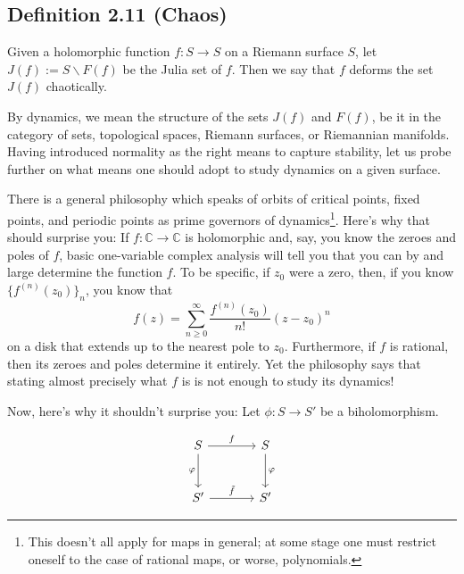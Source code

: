 \documentclass[11pt,a4paper]{article}
\begin{document}

        \subsection*{Definition 2.11 (Chaos)} Given a holomorphic function $f: S\rightarrow S$ on a Riemann surface $S$, let $J(f) := S\backslash F(f)$ be the Julia set of $f$. Then we say that $f$ deforms the set $J(f)$ chaotically.



        By dynamics, we mean the structure of the sets $J(f)$ and $F(f)$, be it in the category of sets, topological spaces, Riemann surfaces, or Riemannian manifolds. Having introduced normality as the right means to capture stability, let us probe further on what means one should adopt to study dynamics on a given surface.

        There is a general philosophy which speaks of orbits of critical points, fixed points, and periodic points as prime governors of dynamics\footnote{This doesn't all apply for maps in general; at some stage one must restrict oneself to the case of rational maps, or worse, polynomials.}. Here's why that should surprise you: If $f: \mathbb{C} \rightarrow \mathbb{C}$ is holomorphic and, say, you know the zeroes and poles of $f$, basic one-variable complex analysis will tell you that you can by and large determine the function $f$. To be specific, if $z_0$ were a zero, then, if you know $\{f^{(n)}(z_0)\}_n$, you know that
        $$f(z) = \sum_{n \geq 0}^{\infty}{\frac{f^{(n)}(z_0)}{n!}(z-z_0)^n}$$
        on a disk that extends up to the nearest pole to $z_0$. Furthermore, if $f$ is rational, then its zeroes and poles determine it entirely. Yet the philosophy says that stating almost precisely what $f$ is is not enough to study its dynamics!

        Now, here's why it shouldn't surprise you: Let $\phi : S \rightarrow S'$ be a biholomorphism.

       $$ \begin{tikzcd}[column sep = large, row sep = large]
        S \arrow{r}{f} \arrow[swap]{d}{\phi} & S \arrow{d}{\phi} \\%
        S' \arrow{r}{\tilde{f}}& S'
        \end{tikzcd}$$
\end{document}
